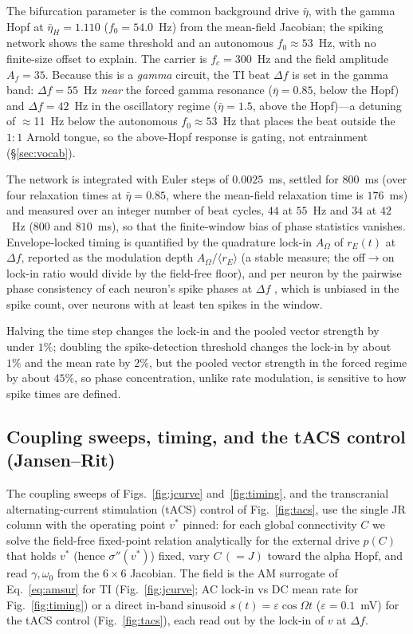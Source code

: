 \documentclass[11pt,a4paper]{article}
\newcommand{\Sig}{\sigma}
\providecommand{\DIFaddbegin}{} %
\providecommand{\DIFaddend}{} %
\begin{document}
\DIFaddend The bifurcation parameter is the common
background drive $\bar\eta$, with the gamma Hopf at $\bar\eta_H=1.110$ ($f_0=54.0$~Hz)
from the mean-field Jacobian; the spiking network shows the same threshold and an
autonomous $f_0\!\approx\!53$~Hz, with no finite-size offset to explain. The carrier is
$f_c=300$~Hz and the field amplitude $A_f=35$. Because
this is a \emph{gamma} circuit, the TI beat $\Delta f$ is set in the gamma band:
$\Delta f=55$~Hz \emph{near} the forced gamma resonance ($\bar\eta=0.85$, below the Hopf) and
$\Delta f=42$~Hz in the oscillatory regime ($\bar\eta=1.5$, above the Hopf)---a detuning of
$\approx$11~Hz below the autonomous $f_0\!\approx\!53$~Hz that places the beat outside the
$1{:}1$ Arnold tongue, so the above-Hopf response is gating, not entrainment
(\S\ref{sec:vocab}).
\DIFaddbegin 

\DIFaddend The network is integrated with Euler steps of $0.0025$~ms, settled for $800$~ms (over
four relaxation times at $\bar\eta=0.85$, where the mean-field relaxation time is
$176$~ms) and measured over an integer number of beat cycles, $44$ at $55$~Hz and $34$ at
$42$~Hz ($800$ and $810$~ms), so that the finite-window bias of phase statistics
vanishes. Envelope-locked timing is quantified by the quadrature lock-in $A_\Omega$ of
$r_E(t)$ at $\Delta f$, reported as the modulation depth $A_\Omega/\langle r_E\rangle$ (a
stable measure; the off$\to$on lock-in ratio would divide by the field-free floor), and
per neuron by the pairwise phase consistency of each neuron's spike phases at $\Delta f$
\cite{vinck2010}, which is unbiased in the spike count, over neurons with at least ten
spikes in the window.
\DIFaddbegin 

\DIFaddend Halving the time step changes the lock-in and the pooled vector
strength by under $1\%$; doubling the spike-detection threshold changes the lock-in by
about $1\%$ and the mean rate by $2\%$, but the pooled vector strength in the forced
regime by about $45\%$, so phase concentration, unlike rate modulation, is sensitive to
how spike times are defined.

\subsection{Coupling sweeps, timing, and the tACS control (Jansen--Rit)}
The coupling sweeps of Figs.~\ref{fig:jcurve} and~\ref{fig:timing}, and the transcranial
alternating-current stimulation (tACS) control of Fig.~\ref{fig:tacs}, use the single JR
column with the operating point $v^*$ pinned: for
each global connectivity $C$ we solve the field-free fixed-point relation analytically
for the external drive $p(C)$ that holds $v^*$ (hence $\Sig''(v^*)$) fixed, vary $C\,(=J)$
toward the alpha Hopf, and read $\gamma,\omega_0$ from the $6\times6$ Jacobian. The field
is the AM surrogate of Eq.~\eqref{eq:amsur} for TI (Fig.~\ref{fig:jcurve}; AC lock-in vs DC mean
rate for Fig.~\ref{fig:timing}) or a direct in-band sinusoid $s(t)=\varepsilon\cos\Omega t$
($\varepsilon=0.1$~mV) for the tACS control (Fig.~\ref{fig:tacs}), each read out by the
lock-in of $v$ at $\Delta f$.
\end{document}
